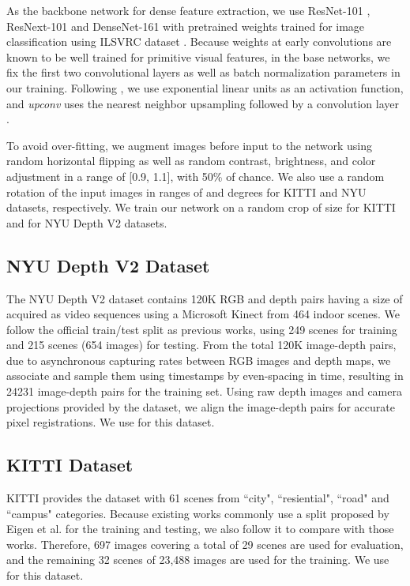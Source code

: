 \documentclass[10pt,twocolumn,letterpaper]{article}
\begin{document}
As the backbone network for dense feature extraction, we use ResNet-101 \cite{he2016deep}, ResNext-101 \cite{xie2017cvpr} and DenseNet-161 \cite{huang2017densely} with pretrained weights trained for image classification using ILSVRC dataset \cite{russakovsky2015imagenet}.
Because weights at early convolutions are known to be well trained for primitive visual features, in the base networks, we fix the first two convolutional layers as well as batch normalization parameters in our training.
Following \cite{godard2017unsupervised}, we use exponential linear units \cite{clevert2015fast} as an activation function, and \textit{upconv} uses the nearest neighbor upsampling followed by a  convolution layer \cite{odena2016deconvolution}.

To avoid over-fitting, we augment images before input to the network using random horizontal flipping as well as random contrast, brightness, and color adjustment in a range of [0.9, 1.1], with 50\% of chance.
We also use a random rotation of the input images in ranges of  and  degrees for KITTI and NYU datasets, respectively.
We train our network on a random crop of size  for KITTI and  for NYU Depth V2 datasets.

\subsection{NYU Depth V2 Dataset}
The NYU Depth V2 dataset \cite{silberman2012indoor} contains 120K RGB and depth pairs having a size of  acquired as video sequences using a Microsoft Kinect from 464 indoor scenes.
We follow the official train/test split as previous works, using 249 scenes for training and 215 scenes (654 images) for testing.
From the total 120K image-depth pairs, due to asynchronous capturing rates between RGB images and depth maps, we associate and sample them using timestamps by even-spacing in time, resulting in 24231 image-depth pairs for the training set.
Using raw depth images and camera projections provided by the dataset, we align the image-depth pairs for accurate pixel registrations.
We use  for this dataset.


\subsection{KITTI Dataset}
KITTI provides the dataset \cite{geiger2013vision} with 61 scenes from ``city", ``resiential", ``road" and ``campus" categories.
Because existing works commonly use a split proposed by Eigen et al. \cite{eigen2014depth} for the training and testing, we also follow it to compare with those works.
Therefore, 697 images covering a total of 29 scenes are used for evaluation, and the remaining 32 scenes of 23,488 images are used for the training.
We use  for this dataset.
\end{document}
